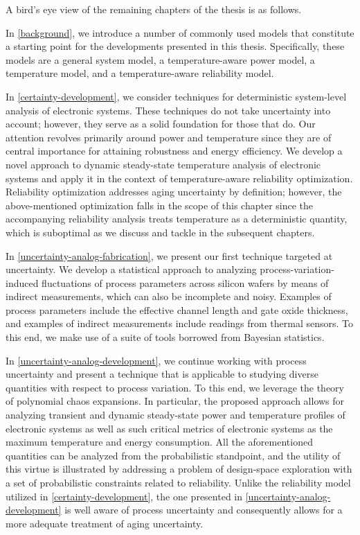 A bird's eye view of the remaining chapters of the thesis is as follows.

In \cref{background}, we introduce a number of commonly used models that
constitute a starting point for the developments presented in this thesis.
Specifically, these models are a general system model, a temperature-aware power
model, a temperature model, and a temperature-aware reliability model.

In \cref{certainty-development}, we consider techniques for deterministic
system-level analysis of electronic systems. These techniques do not take
uncertainty into account; however, they serve as a solid foundation for those
that do. Our attention revolves primarily around power and temperature since
they are of central importance for attaining robustness and energy efficiency.
We develop a novel approach to dynamic steady-state temperature analysis of
electronic systems and apply it in the context of temperature-aware reliability
optimization. Reliability optimization addresses aging uncertainty by
definition; however, the above-mentioned optimization falls in the scope of this
chapter since the accompanying reliability analysis treats temperature as a
deterministic quantity, which is suboptimal as we discuss and tackle in the
subsequent chapters.

In \cref{uncertainty-analog-fabrication}, we present our first technique
targeted at uncertainty. We develop a statistical approach to analyzing
process-variation-induced fluctuations of process parameters across silicon
wafers by means of indirect measurements, which can also be incomplete and
noisy. Examples of process parameters include the effective channel length and
gate oxide thickness, and examples of indirect measurements include readings
from thermal sensors. To this end, we make use of a suite of tools borrowed from
Bayesian statistics.

In \cref{uncertainty-analog-development}, we continue working with process
uncertainty and present a technique that is applicable to studying diverse
quantities with respect to process variation. To this end, we leverage the
theory of polynomial chaos expansions. In particular, the proposed approach
allows for analyzing transient and dynamic steady-state power and temperature
profiles of electronic systems as well as such critical metrics of electronic
systems as the maximum temperature and energy consumption. All the
aforementioned quantities can be analyzed from the probabilistic standpoint, and
the utility of this virtue is illustrated by addressing a problem of
design-space exploration with a set of probabilistic constraints related to
reliability. Unlike the reliability model utilized in
\cref{certainty-development}, the one presented in
\cref{uncertainty-analog-development} is well aware of process uncertainty and
consequently allows for a more adequate treatment of aging uncertainty.

